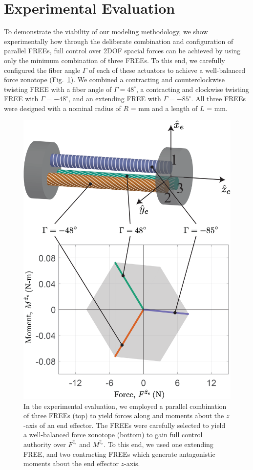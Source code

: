 \section{Experimental Evaluation}
\label{sec:experiment}
To demonstrate the viability of our modeling methodology, we show experimentally how through the deliberate combination and configuration of parallel FREEs, full control over 2DOF spacial forces can be achieved by using only the minimum combination of three FREEs.
To this end, we carefully configured the fiber angle $\Gamma$ of each of these actuators to achieve a well-balanced force zonotope (Fig.~\ref{fig:rigDiagram}).
We combined a contracting and counterclockwise twisting FREE with a fiber angle of $\Gamma = 48^\circ$, a contracting and clockwise twisting FREE with $\Gamma = -48^\circ$, and an extending FREE with $\Gamma = -85^\circ$.
All three FREEs were designed with a nominal radius of $R$ = \unit[5]{mm} and a length of $L$ = \unit[100]{mm}.
%
\begin{figure}
    \centering
    \includegraphics[width=0.85\linewidth]{figures/rigDiagram_wlabels10.png}
    \caption{In the experimental evaluation, we employed a parallel combination of three FREEs (top) to yield forces along and moments about the $z$-axis of an end effector.
    The FREEs were carefully selected to yield a well-balanced force zonotope (bottom) to gain full control authority over $F^{\hat{z}_e}$ and $M^{\hat{z}_e}$.
    To this end, we used one extending FREE, and two contracting FREEs which generate antagonistic moments about the end effector $z$-axis.}
    \label{fig:rigDiagram}
\end{figure}


